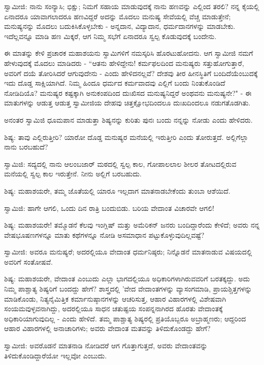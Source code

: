 ಸ್ವಾಮೀಜಿ: ನಾನು ಸಂನ್ಯಾಸಿ; ಭಿಕ್ಷು; ನಿಮಗೆ ಸಹಾಯ ಮಾಡುವುದಕ್ಕೆ ನಾನು ಹಣವನ್ನು ಎಲ್ಲಿಂದ ತರಲಿ? ನನ್ನ ಕೈಯಲ್ಲಿ ಏನಾದರೂ ಯಾವಾಗಲಾದರೂ ಹಣವಿದ್ದರೆ ಅದನ್ನು ಮೊದಲು ಮನುಷ್ಯ ಸೇವೆಯಲ್ಲಿ ವೆಚ್ಚ ಮಾಡುತ್ತೇನೆ; ಮನುಷ್ಯನನ್ನು ಮೊದಲು ಬದುಕಿಸಿಕೊಳ್ಳಬೇಕು - ಅನ್ನದಾನ, ವಿದ್ಯಾದಾನ, ಧರ್ಮದಾನಗಳನ್ನು ಮಾಡಬೇಕು. ಇದೆಲ್ಲವನ್ನೂ ಮಾಡಿ ಹಣ ಮಿಕ್ಕರೆ, ಆಗ ನಿಮ್ಮ ಸಭೆಗೆ ಏನಾದರೂ ಸ್ವಲ್ಪ ಕೊಡುವುದಕ್ಕೆ ಬಂದೇನು.

ಈ ಮಾತನ್ನು ಕೇಳಿ ಪ್ರಚಾರಕ ಮಹಾಶಯನು ಸ್ವಾಮಿಗಳಿಗೆ ನಮಸ್ಕರಿಸಿ ಹೊರಟುಹೋದನು. ಆಗ ಸ್ವಾಮೀಜಿ ನಮಗೆ ಹೇಳುವುದಕ್ಕೆ ಮೊದಲು ಮಾಡಿದರು - “ಆತನು ಹೇಳಿದ್ದೇನು! ಕರ್ಮಫಲದಿಂದ ಮನುಷ್ಯರು ಸತ್ತುಹೋಗುತ್ತಾರೆ, ಅವರಿಗೆ ದಯೆ ತೋರಿಸಿದರೆ ಆಗುವುದೇನು - ಎಂದು ಹೇಳಿದನಲ್ಲವೆ? ದೇಶವು ತೀರ ಹೀನಸ್ಥಿತಿಗೆ ಬಂದಿದೆಯೆಂಬುದಕ್ಕೆ ಇದು ದೊಡ್ಡ ಸಾಕ್ಷಿಯಾಗಿದೆ. ನಿಮ್ಮ ಹಿಂದೂ ಧರ್ಮದ ಕರ್ಮವಾದವು ಎಲ್ಲಿಗೆ ಬಂದು ನಿಂತುಕೊಂಡಿದೆ ನೋಡಿದಿಯೊ? ಮನುಷ್ಯರ ಕಷ್ಟಕ್ಕಾಗಿ ಅನುಕಂಪದಿಂದ ದುಃಖಿಸದ ಮನುಷ್ಯನಿದ್ದರೆ ಅಂಥವನು ಮನುಷ್ಯನೇ?" - ಈ ಮಾತುಗಳನ್ನು ಆಡುತ್ತ ಆಡುತ್ತ ಸ್ವಾಮೀಜಿಯ ದೇಹವು ಚಿತ್ತಕ್ಷೋಭದಿಂದಲೂ ದುಃಖದಿಂದಲೂ ನಡುಗತೊಡಗಿತು.

ಅನಂತರ ಸ್ವಾಮಿಜಿ ಧೂಮಪಾನ ಮಾಡುತ್ತಾ ಶಿಷ್ಯನನ್ನು ಕುರಿತು ಪುನಃ ಬಂದು ನನ್ನನ್ನು ನೋಡು ಎಂದು ಹೇಳಿದರು.

\newpage

ಶಿಷ್ಯ: ತಾವು ಎಲ್ಲಿರುತ್ತೀರಿ? ಯಾರೋ ದೊಡ್ಡ ಮನುಷ್ಯರ ಮನೆಯಲ್ಲಿ ಇರುತ್ತೀರಿ ಎಂದು ತೋರುತ್ತದೆ. ಅಲ್ಲಿಗೆಲ್ಲಾ ನಾನು ಬರಬಹುದೆ?

ಸ್ವಾಮಿಜಿ: ಸದ್ಯದಲ್ಲಿ ನಾನು ಆಲಂಬಜಾರ್‌ ಮಠದಲ್ಲಿ ಸ್ವಲ್ಪ ಕಾಲ, ಗೋಪಾಲಲಾಲ ಶೀಲರ ತೋಟದಲ್ಲಿರುವ ಮನೆಯಲ್ಲಿ ಸ್ವಲ್ಪ ಕಾಲ ಇರುತ್ತೇನೆ. ನೀನು ಅಲ್ಲಿಗೆ ಬರಬಹುದು.

ಶಿಷ್ಯ: ಮಹಾಶಯರೇ, ತಮ್ಮ ಜೊತೆಯಲ್ಲಿ ಯಾರೂ ಇಲ್ಲದಾಗ ಮಾತನಾಡಬೇಕೆಂದು ತುಂಬಾ ಆಶೆಯಿದೆ.

ಸ್ವಾಮಿಜಿ: ಹಾಗೇ ಆಗಲಿ, ಒಂದು ದಿನ ರಾತ್ರಿ ಬಂದುಬಿಡು. ಬರಿಯ ವೇದಾಂತ ವಿಚಾರವೇ ಆಗಲಿ!

ಶಿಷ್ಯ: ಮಹಾಶಯರೇ! ತಮ್ಮೊಡನೆ ಕೆಲವು ಇಂಗ್ಲಿಷ್ ಮತ್ತು ಅಮೆರಿಕನ್ ಜನರು ಬಂದಿದ್ದಾರೆಂದು ಕೇಳಿದೆ; ಅವರು ನನ್ನ ವೇಷಭೂಷಣಗಳನ್ನೂ ಮಾತು ಕಥೆಗಳನ್ನೂ ನೋಡಿ ಅಸಮಾಧಾನ ಪಟ್ಟುಕೊಳ್ಳುವುದಿಲ್ಲವಷ್ಟೆ?

ಸ್ವಾಮೀಜಿ: ಅವರೂ ಮನುಷ್ಯರೆ; ಅದರಲ್ಲಿಯೂ ವೇದಾಂತ ಧರ್ಮನಿಷ್ಠರು; ನಿನ್ನೊಡನೆ ಮಾತನಾಡುವ ವಿಷಯದಲ್ಲಿ ಅವರಿಗೆ ಸಂತೋಷವೆ.

ಶಿಷ್ಯ: ಮಹಾಶಯರೇ, ವೇದಾಂತ ಎಂಬುದು ಎಲ್ಲಾ ಭಾಗದಲ್ಲಿಯೂ ಅಧಿಕಾರಿಗಳಾಗಿರುವವರಿಗೆ ಬರತಕ್ಕದ್ದು. ಅದು ನಿಮ್ಮ ಪಾಶ್ಚಾತ್ಯ ಶಿಷ್ಯರಿಗೆ ಬಂದದ್ದು ಹೇಗೆ? ಶಾಸ್ತ್ರದಲ್ಲಿ 'ವೇದ ವೇದಾಂತಗಳನ್ನು ವ್ಯಾಸಂಗಮಾಡಿ, ಪ್ರಾಯಶ್ಚಿತ್ತಗಳನ್ನು ಮಾಡಿಕೊಂಡು, ನಿತ್ಯನೈಮಿತ್ತಿಕ ಕರ್ಮಾನುಷ್ಠಾನಗಳನ್ನು ಆಚರಿಸುತ್ತ, ಆಹಾರ ವಿಹಾರಗಳಲ್ಲಿ ವಿಶೇಷವಾಗಿ ಸಂಯಮವುಳ್ಳವನಾಗಿದ್ದು, ಅದರಲ್ಲಿಯೂ ಸಾಧನ ಚತುಷ್ಟಯ ಸಂಪನ್ನನಾಗಿರದ ಹೊರತು ವೇದಾಂತಕ್ಕೆ ಅಧಿಕಾರಿಯಾಗುವುದಿಲ್ಲ - ಎಂದು ಹೇಳಿದೆ. ತಮ್ಮ ಪಾಶ್ಚಾತ್ಯ ಶಿಷ್ಯರಲ್ಲಿ ಪ್ರತಿಯೊಬ್ಬರೂ ಅಬ್ರಾಹ್ಮಣರು; ಆದ್ದರಿಂದ ಆಹಾರ ವಿಹಾರಗಳಲ್ಲಿ ಅನಾಚಾರಿಗಳು; ಅವರು ವೇದಾಂತ ಮತವನ್ನು ತಿಳಿದುಕೊಂಡದ್ದು ಹೇಗೆ?

ಸ್ವಾಮೀಜಿ: ಅವರೊಡನೆ ಮಾತನಾಡಿ ನೋಡಿದರೆ ಆಗ ಗೊತ್ತಾಗುತ್ತದೆ, ಅವರು ವೇದಾಂತವನ್ನು ತಿಳಿದುಕೊಂಡಿದ್ದಾರೆಯೋ ಇಲ್ಲವೋ ಎಂಬುದು.

